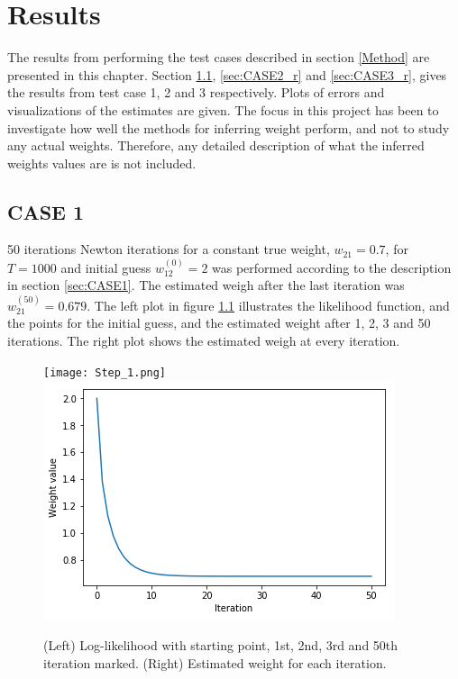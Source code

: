 
\chapter{Results}

The results from performing the test cases described in section \ref{Method} are presented in this chapter. Section \ref{sec:CASE1_r}, \ref{sec:CASE2_r} and \ref{sec:CASE3_r}, gives the results from test case 1, 2 and 3 respectively. Plots of errors and visualizations of the estimates are given. The focus in this project has been to investigate how well the methods for inferring weight perform, and not to study any actual weights. Therefore, any detailed description of what the inferred weights values are is not included.

\section{CASE 1}
\label{sec:CASE1_r}
50 iterations Newton iterations for a constant true weight, $w_{21} = 0.7$, for $T=1000$ and initial guess $w_{12}^{(0)} = 2$ was performed according to the description in section \ref{sec:CASE1}. The estimated weigh after the last iteration was $w_{21}^{(50)}=0.679$. The left plot in figure \ref{fig:Newton} illustrates the likelihood function, and the points for the initial guess, and the estimated weight after 1, 2, 3 and 50 iterations. The right plot shows the estimated weigh at every iteration.



\begin{figure}[hbt!]
\caption{(Left) Log-likelihood with starting point, 1st, 2nd, 3rd and 50th iteration marked. (Right) Estimated weight for each iteration.}
\label{fig:Newton}
    \centering
    \texttt{[image: Step\_1.png]}
    \includegraphics[scale=0.40]{fig/Step_1_it.png}
\end{figure}

